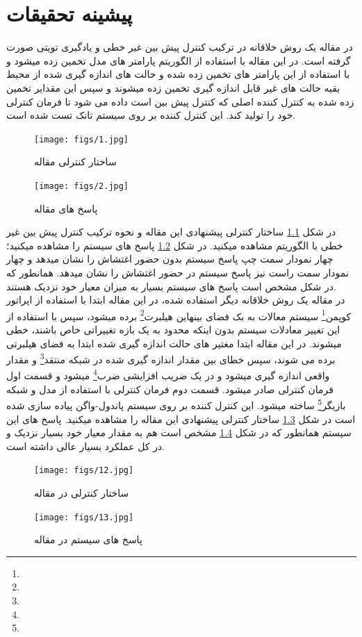 \documentclass[12pt,a4paper]{report}
\begin{document}
	\chapter{پیشینه تحقیقات}
	در مقاله \cite{alhazmi2022reinforcement} یک روش خلاقانه در ترکیب کنترل پیش بین غیر خطی و یادگیری تویتی صورت گرفته است. در این مقاله با استفاده از الگوریتم \cite{lillicrap2015continuous} پارامتر های مدل تخمین زده میشود و با استفاده از این پارامتر های تخمین زده شده و حالت های اندازه گیری شده از محیط بقیه حالت های غیر قابل اندازه گیری تخمین زده میشوند و سپس این مقدایر تخمین زده شده به کنترل کننده اصلی که کنترل پیش بین است داده می شود تا فرمان کنترلی خود را تولید کند. این کنترل کننده بر روی سیستم تانک تست شده است.
	\begin{figure}
		\texttt{[image: figs/1.jpg]}
		\caption{ساختار کنترلی مقاله \cite{alhazmi2022reinforcement}}
		\label{fig:DDPG_MPC}
	\end{figure}

	\begin{figure}
		\texttt{[image: figs/2.jpg]}
		\caption{پاسخ های مقاله \cite{alhazmi2022reinforcement}}
		\label{fig:DDPG_MPC_RES}
	\end{figure}
	در شکل \ref{fig:DDPG_MPC} ساختار کنترلی پیشنهادی این مقاله و نحوه ترکیب کنترل پیش بین غیر خطی با الگوریتم   مشاهده میکنید. در شکل \ref{fig:DDPG_MPC_RES} پاسخ های سیستم را مشاهده میکنید؛ چهار نمودار سمت چپ پاسخ سیستم بدون حضور اغتشاش را نشان میدهد و چهار نمودار سمت راست نیز پاسخ سیستم  در حضور اغتشاش را نشان میدهد. همانطور که در شکل مشخص است پاسخ های سیستم بسیار به میزان معیار خود نزدیک هستند.\\
	
	
	در مقاله \cite{zhang2022robust} یک روش خلاقانه دیگر استفاده شده، در این مقاله ابتدا با استفاده از اپراتور کوپمن\footnote{} سیستم معالات به بک فضای بینهاین هیلبرت\footnote{} برده میشود، سپس با استفاده از این تغییر معادلات سیستم بدون اینکه محدود به یک بازه تغییراتی خاص باشند، خطی میشوند. در این مقاله ابتدا مغتیر های حالت اندازه گیری شده ابتدا به فضای هیلبرتی برده می شوند، سپس خطای بین مقدار اندازه گیری شده در شبکه منتقد\footnote{} و مقدار واقعی اندازه گیری میشود و در یک ضریب افزایشی ضرب\footnote{} میشود و قسمت اول فرمان کنترلی صادر میشود. قسمت دوم فرمان کنترلی با استفاده از مدل و شبکه بازیگر\footnote{} ساخته میشود. این کنترل کننده بر روی سیستم پاندول-واگن پیاده سازی شده است در شکل \ref{fig:KMPC} ساختار کنترلی پیشنهادی این مقاله را مشاهده میکنید. پاسخ های این سیستم همانطور که در شکل \ref{fig:KMPC_res} مشخص است هم به مقدار معیار خود بسیار نزدیک و در کل عملکرد بسیار عالی داشته است.\\
	\begin{figure}
		\texttt{[image: figs/12.jpg]}
		\caption{ساختار کنترلی در مقاله \cite{zhang2022robust}}
		\label{fig:KMPC}
	\end{figure}
	\begin{figure}
		\texttt{[image: figs/13.jpg]}
		\caption{پاسخ های سیستم در مقاله \cite{zhang2022robust}}
		\label{fig:KMPC_res}
	\end{figure}
	
\end{document}
